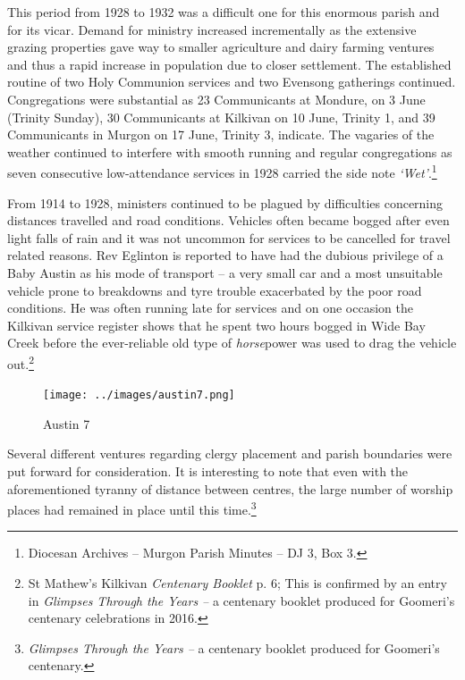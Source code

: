 This period from 1928 to 1932 was a difficult one for this enormous parish and for its vicar. Demand for ministry increased incrementally as the extensive grazing properties gave way to smaller agriculture and dairy farming ventures and thus a rapid increase in population due to closer settlement. The established routine of two Holy Communion services and two Evensong gatherings continued. Congregations were substantial as 23 Communicants at Mondure, on 3 June (Trinity Sunday), 30 Communicants at Kilkivan on 10 June, Trinity 1, and 39 Communicants in Murgon on 17 June, Trinity 3, indicate. The vagaries of the weather continued to interfere with smooth running and regular congregations as seven consecutive low-attendance services in 1928 carried the side note \emph{`Wet'}.\footnote{Diocesan Archives -- Murgon Parish Minutes -- DJ 3, Box 3.}


From 1914 to 1928, ministers continued to be plagued by difficulties concerning distances travelled and road conditions. Vehicles often became bogged after even light falls of rain and it was not uncommon for services to be cancelled for travel related reasons. Rev Eglinton is reported to have had the dubious privilege of a Baby Austin as his mode of transport -- a very small car and a most unsuitable vehicle prone to breakdowns and tyre trouble exacerbated by the poor road conditions. He was often running late for services and on one occasion the Kilkivan service register shows that he spent two hours bogged in Wide Bay Creek before the ever-reliable old type of \emph{horse}power was used to drag the vehicle out.\footnote{St Mathew's Kilkivan \emph{Centenary Booklet} p. 6; This is confirmed by an entry in \emph{Glimpses Through the Years --} a centenary booklet produced for Goomeri's centenary celebrations in 2016.}








\begin{figure}[!htb]
\begin{center}
\texttt{[image: ../images/austin7.png]}
\caption{Austin 7}
\end{center}
\end{figure}




Several different ventures regarding clergy placement and parish boundaries were put forward for consideration. It is interesting to note that even with the aforementioned tyranny of distance between centres, the large number of worship places had remained in place until this time.\footnote{\emph{Glimpses Through the Years --} a centenary booklet produced for Goomeri's centenary.}


